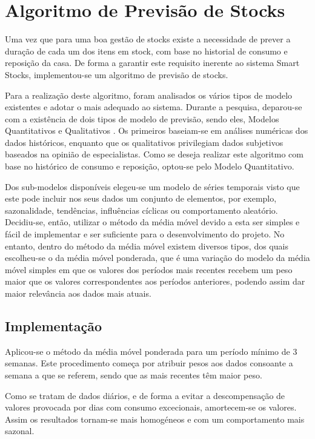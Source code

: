 \section{Algoritmo de Previsão de Stocks}\label{sec34}

Uma vez que para uma boa gestão de stocks existe a necessidade de prever a duração de cada um dos itens em stock, com base no historial de consumo e reposição da casa. De forma a garantir este requisito inerente ao sistema Smart Stocks, implementou-se um algoritmo de previsão de stocks.

Para a realização deste algoritmo, foram analisados os vários tipos de modelo existentes e adotar o mais adequado ao sistema. Durante a pesquisa, deparou-se com a existência de dois tipos de modelo de previsão, sendo eles, Modelos Quantitativos e Qualitativos \cite{GestaoStocks:MetodosPrevisaoStocks}. Os primeiros baseiam-se em análises numéricas dos dados históricos, enquanto que os qualitativos privilegiam dados subjetivos baseados na opinião de especialistas. Como se deseja realizar este algoritmo com base no histórico de consumo e reposição, optou-se pelo Modelo Quantitativo. 

Dos sub-modelos disponíveis elegeu-se um modelo de séries temporais visto que este pode incluir nos seus dados um conjunto de elementos, por exemplo, sazonalidade, tendências, influências cíclicas ou comportamento aleatório. Decidiu-se, então, utilizar o método da média móvel devido a esta ser simples e fácil de implementar e ser suficiente para o desenvolvimento do projeto. No entanto, dentro do método da média móvel existem diversos tipos, dos quais escolheu-se o da média móvel ponderada, que é uma variação do modelo da média móvel simples em que os valores dos períodos mais recentes recebem um peso maior que os valores correspondentes aos períodos anteriores, podendo assim dar maior relevância aos dados mais atuais.

%
%
\subsection{Implementação}\label{subsec341}

Aplicou-se o método da média móvel ponderada para um período mínimo de 3 semanas. Este procedimento começa por atribuir pesos aos dados consoante a semana a que se referem, sendo que as mais recentes têm maior peso.

Como se tratam de dados diários, e de forma a evitar a descompensação de valores provocada por dias com consumo excecionais, amortecem-se  os valores. Assim os resultados tornam-se mais homogéneos e com um comportamento mais sazonal.   

